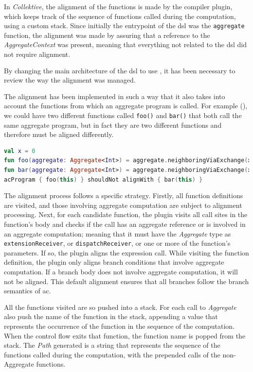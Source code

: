 In \emph{Collektive}, the alignment of the functions is made by the compiler plugin, which keeps track of the sequence of
functions called during the computation, using a custom stack.
Since initially the entrypoint of the \ac{dsl} was the \texttt{aggregate} function, the alignment was made by assuring
that a reference to the \emph{AggregateContext} was present, meaning that everything not related to the \ac{dsl} did not
require alignment.

By changing the main architecture of the \ac{dsl} to use \xc{}, it has been necessary to review the way the alignment was managed.

The alignment has been implemented in such a way that it also takes into account the functions from which an aggregate program is called.
For example (), we could have two different functions called \texttt{foo()} and \texttt{bar()} that both call the same aggregate program,
but in fact they are two different functions and therefore must be aligned differently.

\begin{lstlisting}[language=kt,label={lst:not-aligned}, caption={Example of two unaligned functions.}]
val x = 0
fun foo(aggregate: Aggregate<Int>) = aggregate.neighboringViaExchange(x)
fun bar(aggregate: Aggregate<Int>) = aggregate.neighboringViaExchange(x)
acProgram { foo(this) } shouldNot alignWith { bar(this) }
\end{lstlisting}

The alignment process follows a specific strategy.
Firstly, all function definitions are visited, and those involving aggregate computation are subject to alignment processing.
Next, for each candidate function, the plugin visits all call sites in the function's body and checks if the call has an
aggregate reference or is involved in an aggregate computation; meaning that it must have the \emph{Aggregate} type as
\texttt{extensionReceiver}, or \texttt{dispatchReceiver}, or one or more of the function's parameters.
If so, the plugin aligns the expression call.
While visiting the function definition, the plugin only aligns branch conditions that involve aggregate computation.
If a branch body does not involve aggregate computation, it will not be aligned.
This default alignment ensures that all branches follow the branch semantics of \ac{ac}.

All the functions visited are so pushed into a stack.
For each call to \emph{Aggregate} also push the name of the function in the stack, appending a value that represents the
occurrence of the function in the sequence of the computation.
When the control flow exits that function, the function name is popped from the stack.
The \emph{Path} generated is a string that represents the sequence of the functions called during the computation,
with the prepended calls of the non-Aggregate functions.

